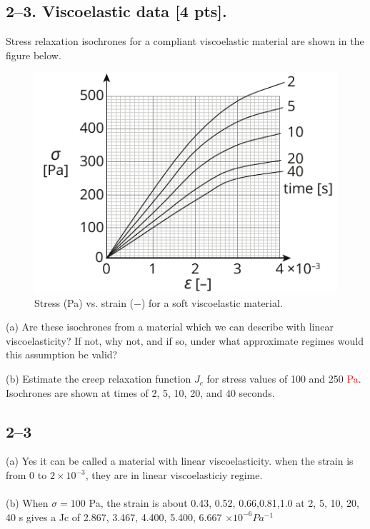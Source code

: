 \bigskip
\subsection*{2--3. \textbf{Viscoelastic data} [4 pts].} 
Stress relaxation isochrones for a compliant viscoelastic material are shown in the figure below.  

\begin{figure}[H]
\vspace{-1em}
\centering
\includegraphics[scale = 1.5]{instr-figures/PS2-Q3.pdf}
\caption{\small{Stress (Pa) vs. strain ($-$) for a soft viscoelastic material.}}
\end{figure}

\vspace{-1em}
(a) Are these isochrones from a material which we can describe with linear viscoelasticity? If not, why not, and if so, under what approximate regimes would this assumption be valid? 

\medskip
(b) Estimate the creep relaxation function $J_c$ for stress values of 100 and 250 \textcolor{red}{Pa}. Isochrones are shown at times of 2, 5, 10, 20, and 40 seconds.   

\subsection*{2--3}
(a) Yes it can be called a material with linear viscoelasticity. when the strain is from 0 to $2 \times 10^{-3}$, they are in linear viscoelasticiy regime. \\
\\
(b) When $\sigma = 100$ Pa, the strain is about 0.43, 0.52, 0.66,0.81,1.0  at 2, 5, 10, 20, 40 s  gives a Jc of 2.867, 3.467, 4.400, 5.400, 6.667 $\times10^{-6} Pa^{-1}$

